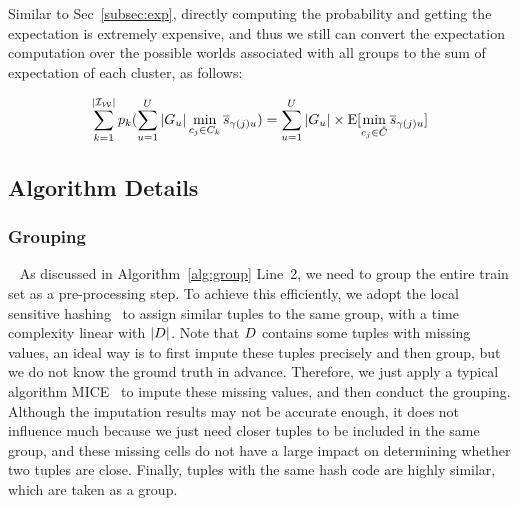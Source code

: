 Similar to Sec~\ref{subsec:exp}, directly computing the probability and getting the expectation is extremely expensive, and thus we still can convert the expectation computation over the possible worlds associated with all groups to the sum of expectation of each cluster, as follows:

\begin{equation}\label{eqa:cluster-4}
    \begin{aligned}
        \sum_{k= 1}^{|\mathcal{I_W}|} p_k (\sum_{u=1}^U |G_u| \min_{c_j\in C_k} \overline{s}_{\gamma(j)u}) = \sum_{u=1}^U  |G_u| \times\mathrm{E}[\min_{c_j\in \hat{C}}\overline{s}_{\gamma(j)u}]
    \end{aligned}
\end{equation}

\subsection{Algorithm Details}

\vspace{.5em}

\subsubsection{Grouping}~\label{subsec:clustering}
As discussed in Algorithm~\ref{alg:group} Line~2, we need to group the entire train set as a pre-processing step. To achieve this efficiently, we adopt the local sensitive hashing~\cite{DBLP:conf/focs/AndoniI06} to assign similar tuples to the same group, with a time complexity linear with $|D|$.
%
Note that $D$ contains some tuples with missing values, an ideal way is to first impute these tuples precisely and then group, but we do not know the ground truth in advance. Therefore, we just apply a typical algorithm \ie MICE~\cite{royston2011multiple} to impute these missing values, and then conduct the grouping. Although the imputation results may  not be accurate enough, it does not influence much because we just need closer tuples to be included in the same group, and these missing cells do not have a large impact on determining whether two tuples are close. 
%
Finally, tuples with the same hash code are highly similar, which are taken as a group.

 



